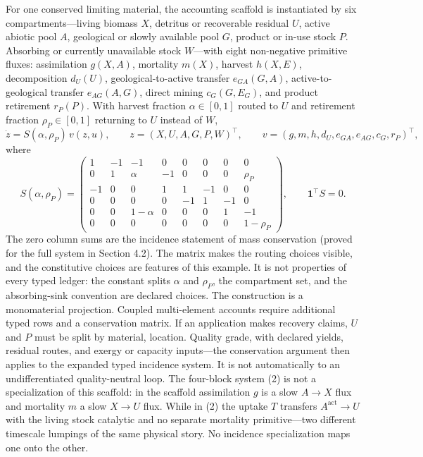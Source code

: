 \documentclass[11pt]{article}
\begin{document}
For one conserved limiting material, the accounting scaffold is instantiated by six compartments---living biomass \(X\), detritus or recoverable residual \(U\), active abiotic pool \(A\), geological or slowly available pool \(G\), product or in-use stock \(P\). Absorbing or currently unavailable stock \(W\)---with eight non-negative primitive fluxes: assimilation \(g(X,A)\), mortality \(m(X)\), harvest \(h(X,E)\), decomposition \(d_U(U)\), geological-to-active transfer \(e_{GA}(G,A)\), active-to-geological transfer \(e_{AG}(A,G)\), direct mining \(c_G(G,E_G)\), and product retirement \(r_P(P)\). With harvest fraction \(\alpha \in [0,1]\) routed to \(U\) and retirement fraction \(\rho_P \in [0,1]\) returning to \(U\) instead of \(W\), \[\dot z = S(\alpha, \rho_P)\, v(z, u), \qquad z = (X, U, A, G, P, W)^\top, \qquad v = (g, m, h, d_U, e_{GA}, e_{AG}, c_G, r_P)^\top,\] where \[S(\alpha, \rho_P) =
\begin{pmatrix}
1 & -1 & -1 & 0 & 0 & 0 & 0 & 0 \\
0 & 1 & \alpha & -1 & 0 & 0 & 0 & \rho_P \\
-1 & 0 & 0 & 1 & 1 & -1 & 0 & 0 \\
0 & 0 & 0 & 0 & -1 & 1 & -1 & 0 \\
0 & 0 & 1-\alpha & 0 & 0 & 0 & 1 & -1 \\
0 & 0 & 0 & 0 & 0 & 0 & 0 & 1-\rho_P
\end{pmatrix}, \qquad \mathbf{1}^\top S = 0.\] The zero column sums are the incidence statement of mass conservation (proved for the full system in Section 4.2). The matrix makes the routing choices visible, and the constitutive choices are features of this example. It is not properties of every typed ledger: the constant splits \(\alpha\) and \(\rho_P\), the compartment set, and the absorbing-sink convention are declared choices. The construction is a monomaterial projection. Coupled multi-element accounts require additional typed rows and a conservation matrix. If an application makes recovery claims, \(U\) and \(P\) must be split by material, location. Quality grade, with declared yields, residual routes, and exergy or capacity inputs---the conservation argument then applies to the expanded typed incidence system. It is not automatically to an undifferentiated quality-neutral loop. The four-block system (2) is not a specialization of this scaffold: in the scaffold assimilation \(g\) is a slow \(A \to X\) flux and mortality \(m\) a slow \(X \to U\) flux. While in (2) the uptake \(T\) transfers \(A^{\mathrm{act}} \to U\) with the living stock catalytic and no separate mortality primitive---two different timescale lumpings of the same physical story. No incidence specialization maps one onto the other.
\end{document}
